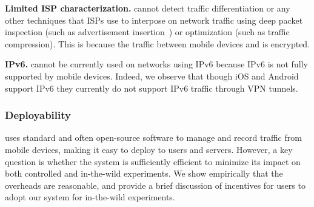 \noindent\textbf{Limited ISP characterization.} \platname{} cannot detect traffic 
differentiation or any other techniques that ISPs use to interpose on network 
traffic using deep packet inspection (such as
advertisement insertion~\cite{reis:tripwires}) or optimization (such as traffic compression). 
This is because the traffic between mobile devices and \platname{}
is encrypted.

\noindent\textbf{IPv6.} \platname{} cannot be currently used on networks using IPv6
because IPv6 is not fully supported by mobile devices. Indeed, we
observe that though iOS and Android support IPv6 they currently do not
support IPv6 traffic through VPN tunnels.


\subsubsection{Deployability}
\platname{} uses standard and often open-source software to manage and
record traffic from mobile devices, making it easy to deploy to users
and servers. However, a key question is whether the system is
sufficiently efficient to minimize its impact on both controlled and
in-the-wild experiments. We show empirically that the overheads are
reasonable, and provide a brief discussion of incentives for users to
adopt our system for in-the-wild experiments.


